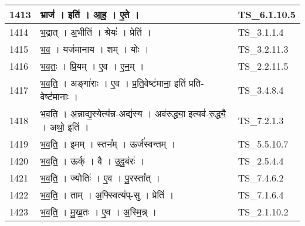 \documentclass[17pt]{extarticle}
\begin{document}
\begin{longtable}{||p{0.4in}||p{4.9in}||p{0.9in}||}
    \hline
        
    1413 & भ्राज॑   ।   इति॑   ।   आ॒ह॒   ।   ए॒ते   ।    & TS\_6.1.10.5       \\
    
    \hline
        
    1414 & भ॒द्रात्   ।   अ॒भीति॑   ।   श्रेयः॑   ।   प्रेति॑   ।    & TS\_3.1.1.4       \\
    
    \hline
        
    1415 & भ॒व॒   ।   यज॑मानाय   ।   शम्   ।   योः   ।    & TS\_3.2.11.3       \\
    
    \hline
        
    1416 & भ॒व॒तः॒   ।   प्रि॒यम्   ।   ए॒व   ।   ए॒न॒म्   ।    & TS\_2.2.11.5       \\
    
    \hline
        
    1417 & भ॒व॒ति॒   ।   अङ्गा॑राः   ।   ए॒व   ।   प्र॒ति॒वेष्ट॑माना॒ इति॑ प्रति{-}वेष्ट॑मानाः   ।    & TS\_3.4.8.4       \\
    
    \hline
        
    1418 & भ॒व॒ति॒   ।   अ॒न्नाद्य॒स्येत्य॑न्न{-}अद्य॑स्य   ।   अव॑रुद्ध्या॒ इत्यव॑{-}रु॒द्ध्यै॒   ।   अथो॒ इति॑   ।    & TS\_7.2.1.3       \\
    
    \hline
        
    1419 & भ॒व॒ति॒   ।   इ॒मम्   ।   स्तन᳚म्   ।   ऊर्ज॑स्वन्तम्   ।    & TS\_5.5.10.7       \\
    
    \hline
        
    1420 & भ॒व॒ति॒   ।   ऊर्क्   ।   वै   ।   उ॒दु॒बंरः॑   ।    & TS\_2.5.4.4       \\
    
    \hline
        
    1421 & भ॒व॒ति॒   ।   ज्योतिः॑   ।   ए॒व   ।   पु॒रस्ता᳚त्   ।    & TS\_7.4.6.2       \\
    
    \hline
        
    1422 & भ॒व॒ति॒   ।   ताम्   ।   अ॒फ्स्वित्य॑प्{-}सु   ।   प्रेति॑   ।    & TS\_7.1.6.4       \\
    
    \hline
        
    1423 & भ॒व॒ति॒   ।   मु॒ख॒तः   ।   ए॒व   ।   अ॒स्मि॒न्न्   ।    & TS\_2.1.10.2       \\
    

\end{longtable}
\end{document}
